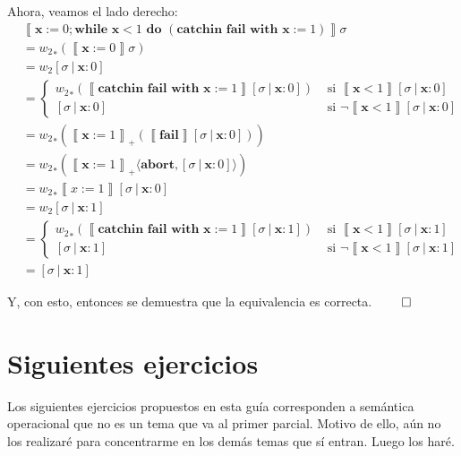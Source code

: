 \documentclass{article}
\newcommand{\sem}[1]{\left\llbracket #1\right\rrbracket}
\newcommand{\x}{\textbf{x}}
\newcommand{\cwhile}[2]{\textbf{while }#1\textbf{ do }#2}
\newcommand{\cfail}{\textbf{fail}}
\newcommand{\ccatch}[2]{\textbf{catchin }#1\textbf{ with }#2}
\newcommand{\cabort}[1]{\langle\textbf{abort}, #1\rangle}
\begin{document}
Ahora, veamos el lado derecho:
\begin{equation*}
  \begin{aligned}
    &\sem{\x := 0; \cwhile{\x<1}{(\ccatch{\cfail}{\x := 1})}}\sigma \\ 
    &= {w_2}_* (\sem{\x := 0}\sigma) \\ 
    &= {w_2} [\sigma\ |\ \x : 0] \\ 
    &= \begin{cases}
        {w_2}_* (\sem{\ccatch{\cfail}{\x := 1}}[\sigma\ |\ \x : 0]) &\text{ si } \sem{\x<1}[\sigma\ |\ \x : 0] \\ 
        [\sigma\ |\ \x : 0] &\text{ si }\neg\sem{\x<1}[\sigma\ |\ \x : 0]
      \end{cases} \\ 
    &= {w_2}_* (\sem{\x := 1}_+ (\sem{\cfail}[\sigma\ |\ \x : 0])) \\ 
    &= {w_2}_* (\sem{\x := 1}_+ \cabort{[\sigma\ |\ \x : 0]}) \\ 
    &= {w_2}_* \sem{x := 1} [\sigma\ |\ \x : 0] \\ 
    &= {w_2} [\sigma\ |\ \x : 1] \\ 
    &= \begin{cases}
        {w_2}_* (\sem{\ccatch{\cfail}{\x := 1}}[\sigma\ |\ \x : 1]) &\text{ si } \sem{\x<1}[\sigma\ |\ \x : 1] \\ 
        [\sigma\ |\ \x : 1] &\text{ si }\neg\sem{\x<1}[\sigma\ |\ \x : 1]
      \end{cases} \\ 
    &= [\sigma\ |\ \x : 1]
  \end{aligned}
\end{equation*}

Y, con esto, entonces se demuestra que la equivalencia es correcta. $\qed$

\section*{Siguientes ejercicios}
Los siguientes ejercicios propuestos en esta guía corresponden a semántica operacional que no es un tema que va al primer parcial.
Motivo de ello, aún no los realizaré para concentrarme en los demás temas que sí entran.
Luego los haré.
\end{document}
